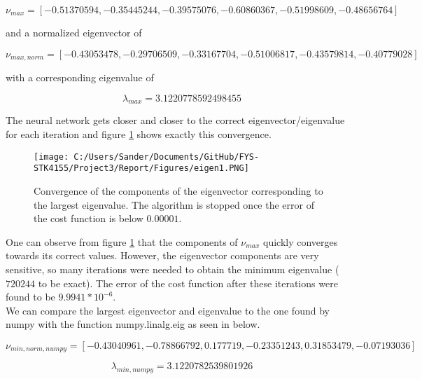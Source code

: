\documentclass[12pt,a4paper]{article}
\begin{document}
\begin{equation}\label{eq:minEigenVec}
\nu_{max}=[-0.51370594, -0.35445244, -0.39575076, -0.60860367, -0.51998609, -0.48656764]
\end{equation}

\noindent and a normalized eigenvector of

\begin{equation}\label{eq:minEigenVecNorm}
\nu_{max, norm}=[-0.43053478, -0.29706509, -0.33167704, -0.51006817, -0.43579814, -0.40779028]
\end{equation}

\noindent with a corresponding eigenvalue of 

\begin{equation}\label{eq:minEigenVal}
\lambda_{max} = 3.1220778592498455
\end{equation}

\noindent The neural network gets closer and closer to the correct eigenvector/eigenvalue for each iteration and figure \ref{fig:eigen1} shows exactly this convergence.

\begin{figure}[H]
\centering
\texttt{[image: C:/Users/Sander/Documents/GitHub/FYS-STK4155/Project3/Report/Figures/eigen1.PNG]}
\caption{\label{fig:eigen1} Convergence of the components of the eigenvector corresponding to the largest eigenvalue. The algorithm is stopped once the error of the cost function is below $0.00001$.}
\end{figure}

\noindent One can observe from figure \ref{fig:eigen1} that the components of $\nu_{max}$ quickly converges towards its correct values. However, the eigenvector components are very sensitive, so many iterations were needed to obtain the minimum eigenvalue ($720244$ to be exact). The error of the cost function after these iterations were found to be $9.9941 *10^{-6}$.
\\
We can compare the largest eigenvector and eigenvalue to the one found by numpy with the function numpy.linalg.eig as seen in below.

\begin{equation}\label{eq:numpyEigenVec}
\nu_{min,norm,numpy} = [-0.43040961, -0.78866792, 0.177719, -0.23351243, 0.31853479, -0.07193036]
\end{equation}

\begin{equation}\label{eq:numpyEigenVal}
\lambda_{min,numpy} = 3.1220782539801926
\end{equation}
\end{document}
